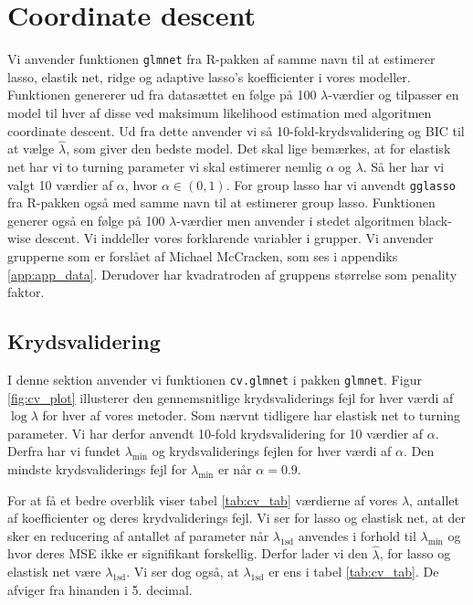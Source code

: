 \section{Coordinate descent}
Vi anvender funktionen \texttt{glmnet} fra R-pakken af samme navn til at estimerer lasso, elastik net, ridge og adaptive lasso's koefficienter i vores modeller. Funktionen genererer ud fra datasættet en følge på 100 $\lambda$-værdier og tilpasser en model til hver af disse ved maksimum likelihood estimation med algoritmen coordinate descent. 
Ud fra dette anvender vi så 10-fold-krydsvalidering og BIC til at vælge $\widehat{\lambda}$, som giver den bedste model. 
Det skal lige bemærkes, at for elastisk net har vi to turning parameter vi skal estimerer nemlig $\alpha$ og $\lambda$.  Så her har vi valgt 10 værdier af  $\alpha$, hvor $\alpha \in (0,1)$. 
For group lasso har vi anvendt \texttt{gglasso} fra R-pakken også med samme navn til at estimerer group lasso. 
Funktionen generer også en følge på 100 $\lambda$-værdier men anvender i stedet algoritmen black-wise descent. 
Vi inddeller vores forklarende variabler i grupper. Vi anvender grupperne som er forslået af Michael McCracken, som ses i appendiks \ref{app:app_data}. Derudover har kvadratroden af gruppens størrelse som penality faktor. 

\subsection{Krydsvalidering}
I denne sektion anvender vi funktionen \texttt{cv.glmnet} i pakken \texttt{glmnet}. 
Figur \ref{fig:cv_plot} illusterer den gennemsnitlige krydsvaliderings fejl for hver værdi af $\log \lambda$ for hver af vores metoder.
Som nærvnt tidligere har elastisk net to turning parameter. Vi har derfor anvendt 10-fold krydsvalidering for 10 værdier af $\alpha$. Derfra har vi fundet  $\lambda_{\min}$ og krydsvaliderings fejlen for hver værdi af $\alpha$.  
Den mindste krydsvaliderings fejl for $\lambda_{\min}$ er når $\alpha =0.9$. 




For at få et bedre overblik viser tabel  \ref{tab:cv_tab} værdierne af vores $\lambda$, antallet af koefficienter og deres krydvaliderings fejl. 
Vi ser for lasso og elastisk net, at der sker en reducering af antallet af parameter når $\lambda_{1\text{sd}}$ anvendes i forhold til $\lambda_{\min}$ og hvor deres MSE ikke er signifikant forskellig.  
Derfor lader vi den $\widehat{\lambda}$, for lasso og elastisk net være $\lambda_{1\text{sd}}$.
Vi ser dog også, at $\lambda_{1\text{sd}}$ er ens i tabel \ref{tab:cv_tab}. 
De afviger fra hinanden i 5. decimal.  

